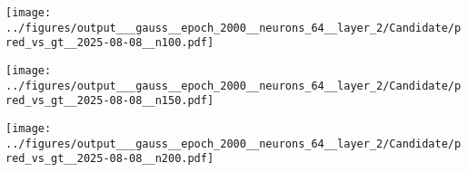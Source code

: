 \begin{otherlanguage}{ngerman}
\begin{samepage}
\begin{minipage}{\textwidth}
\vspace{0.125cm}

\begin{minipage}{0.05\textwidth}
    \centering{}
\end{minipage}%
\begin{minipage}{0.3\textwidth}
    \centering
    \texttt{[image: ../figures/output\_\_\_gauss\_\_epoch\_2000\_\_neurons\_64\_\_layer\_2/Candidate/pred\_vs\_gt\_\_2025-08-08\_\_n100.pdf]}
\end{minipage}%
\begin{minipage}{0.3\textwidth}
    \centering
    \texttt{[image: ../figures/output\_\_\_gauss\_\_epoch\_2000\_\_neurons\_64\_\_layer\_2/Candidate/pred\_vs\_gt\_\_2025-08-08\_\_n150.pdf]}
\end{minipage}%
\begin{minipage}{0.3\textwidth}
    \centering
    \texttt{[image: ../figures/output\_\_\_gauss\_\_epoch\_2000\_\_neurons\_64\_\_layer\_2/Candidate/pred\_vs\_gt\_\_2025-08-08\_\_n200.pdf]}
\end{minipage}

\label{fig:pred_vs_gt_matrix}

\end{minipage}
\end{samepage}


\clearpage







\end{otherlanguage}

